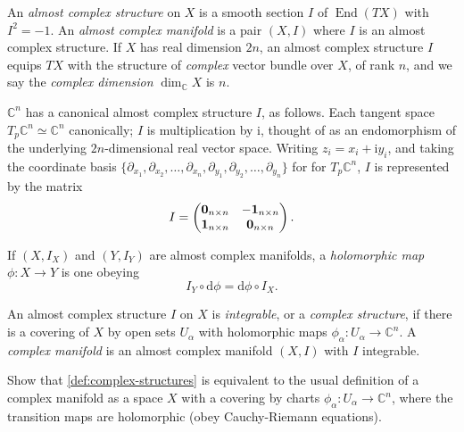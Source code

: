 \documentclass[12pt,letterpaper,reqno]{amsart}
\numberwithin{equation}{section}
\newcommand{\C}{\ensuremath{\mathbb C}}
\newcommand{\I}{{\mathrm i}}
\newcommand{\de}{\mathrm{d}}
\newcommand{\ti}[1]{\textit{#1}}
\DeclareMathOperator{\End}{End}
\begin{document}
\begin{defn}
An \ti{almost complex structure} on $X$ is a smooth section $I$ of $\End(TX)$ with $I^2 = -1$. An \ti{almost complex manifold} is a pair $(X,I)$ where $I$ is an almost complex structure.
If $X$ has real dimension $2n$, an almost complex
structure $I$ equips $TX$ with the structure of
\ti{complex} vector bundle over $X$, of rank $n$,
and we say the \ti{complex dimension} $\dim_\C X$ is
$n$.
\end{defn}

\begin{example} $\C^n$ has a canonical almost complex structure $I$, as follows. Each tangent space $T_p \C^n \simeq \C^n$ canonically; $I$ is multiplication by $\I$, thought of as an 
endomorphism of the underlying $2n$-dimensional real vector space.
Writing $z_i = x_i + \I y_i$, and taking the coordinate basis
$\{\partial_{x_1}, \partial_{x_2}, \dots, \partial_{x_n}, \partial_{y_1}, \partial_{y_2}, \dots, \partial_{y_n}\}$ for for $T_p \C^n$, $I$ is represented by the matrix
\begin{equation}
   I = \begin{pmatrix} {\bf 0}_{n \times n} & -{\bf 1}_{n \times n} \\ {\bf 1}_{n \times n} & {\bf 0}_{n \times n} \end{pmatrix}.
\end{equation}
\end{example}

 \begin{defn} If $(X,I_X)$ and $(Y,I_Y)$ are almost
 complex manifolds, a \ti{holomorphic map} $\phi: X \to Y$
is one obeying
\begin{equation}
 I_Y \circ \de \phi = \de \phi \circ I_X.  
\end{equation}
\end{defn}

\begin{defn} \label{def:complex-structures} An almost complex structure $I$ on $X$ is \ti{integrable}, 
or a \ti{complex structure}, if there is a covering of $X$ by open sets $U_\alpha$ with holomorphic maps $\phi_\alpha: U_\alpha \to \C^n$. A \ti{complex manifold} is an almost complex manifold $(X,I)$ with $I$ integrable.
\end{defn}

\begin{exercise} Show that \autoref{def:complex-structures} is equivalent to the usual definition of a complex manifold as a space
$X$ with a covering by charts $\phi_\alpha: U_\alpha \to \C^n$, where the transition maps are holomorphic (obey Cauchy-Riemann equations).
\end{exercise}
\end{document}
